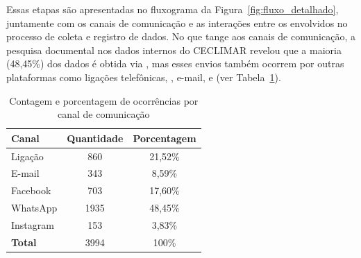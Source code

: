 Essas etapas são apresentadas no fluxograma da Figura~\ref{fig:fluxo_detalhado}, juntamente com os canais de comunicação e as interações entre os envolvidos no processo de coleta e registro de dados. No que tange aos canais de comunicação, a pesquisa documental nos dados internos do CECLIMAR revelou que a maioria (48,45\%) dos dados é obtida via , mas esses envios também ocorrem por outras plataformas como ligações telefônicas, , e-mail, e  (ver Tabela~\ref{tab:contagem_ocorrencias}).

\begin{table}[h]
    \centering
    \caption{Contagem e porcentagem de ocorrências por canal de comunicação}
    \begin{tabular}{|l|c|c|}
    \hline
    \textbf{Canal}     & \textbf{Quantidade} & \textbf{Porcentagem} \\
    \hline
    Ligação     & 860  & 21,52\% \\
    E-mail       & 343  & 8,59\%  \\
    Facebook    & 703  & 17,60\% \\
    WhatsApp    & 1935 & 48,45\% \\
    Instagram   & 153  & 3,83\%  \\
    \hline
    \textbf{Total}     & 3994 & 100\% \\
    \hline
    \end{tabular}
    \label{tab:contagem_ocorrencias}
\end{table}

